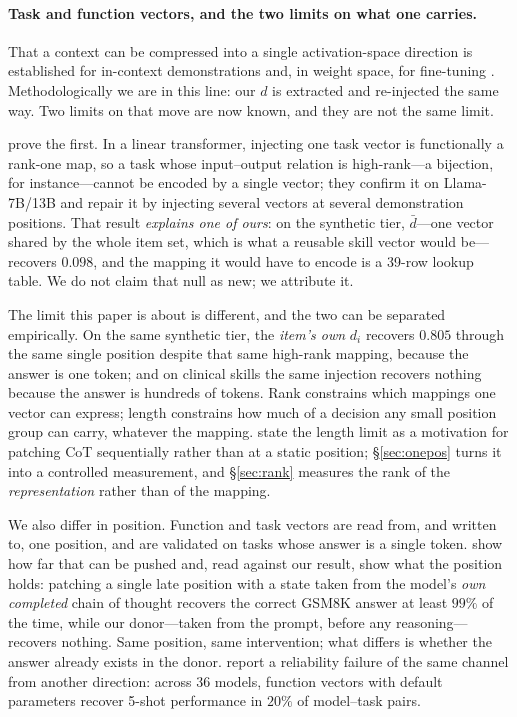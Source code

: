 \documentclass{article}
\newcommand{\dvec}{\ensuremath{d}}
\begin{document}
\paragraph{Task and function vectors, and the two limits on what one carries.}
That a context can be compressed into a single activation-space direction is
established for in-context demonstrations \citep{hendel2023taskvectors,
todd2024functionvectors} and, in weight space, for fine-tuning
\citep{ilharco2023taskarithmetic}. Methodologically we are in this line: our
$\dvec$ is extracted and re-injected the same way. Two limits on that move are
now known, and they are not the same limit.

\citet{dong2026taskvectorlimits} prove the first. In a linear transformer,
injecting one task vector is functionally a rank-one map, so a task whose
input--output relation is high-rank---a bijection, for instance---cannot be
encoded by a single vector; they confirm it on Llama-7B/13B and repair it by
injecting several vectors at several demonstration positions. That result
\emph{explains one of ours}: on the synthetic tier, $\bar{\dvec}$---one vector
shared by the whole item set, which is what a reusable skill vector would
be---recovers $0.098$, and the mapping it would have to encode is a 39-row
lookup table. We do not claim that null as new; we attribute it.

The limit this paper is about is different, and the two can be separated
empirically. On the same synthetic tier, the \emph{item's own} $\dvec_i$
recovers $0.805$ through the same single position despite that same high-rank
mapping, because the answer is one token; and on clinical skills the same
injection recovers nothing because the answer is hundreds of tokens. Rank
constrains which mappings one vector can express; length constrains how much of
a decision any small position group can carry, whatever the mapping.
\citet{dura2026sequentialpatching} state the length limit as a motivation for
patching CoT sequentially rather than at a static position; \S\ref{sec:onepos}
turns it into a controlled measurement, and \S\ref{sec:rank} measures the rank
of the \emph{representation} rather than of the mapping.

We also differ in position. Function and task vectors are read from, and written
to, one position, and are validated on tasks whose answer is a single token.
\citet{mehrafarin2026cothidden} show how far that can be pushed and, read
against our result, show what the position holds: patching a single late
position with a state taken from the model's \emph{own completed} chain of
thought recovers the correct GSM8K answer at least $99\%$ of the time, while our
donor---taken from the prompt, before any reasoning---recovers nothing. Same
position, same intervention; what differs is whether the answer already exists
in the donor. \citet{dasilva2025steeringoff} report a reliability failure of the
same channel from another direction: across 36 models, function vectors with
default parameters recover 5-shot performance in $20\%$ of model--task pairs.
\end{document}

